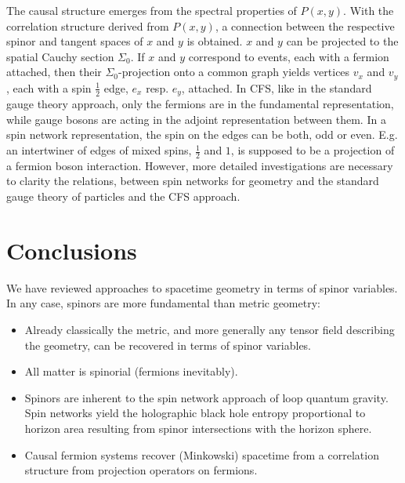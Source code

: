 \documentclass[11pt,a4paper]{article}
\theoremstyle{definition}
\begin{document}
	The causal structure emerges from the spectral properties of $P(x,y)$. With the correlation structure derived from $P(x,y)$, a connection between the respective spinor and tangent spaces
	of $x$ and $y$ is obtained. $x$ and $y$ can be projected to the spatial Cauchy section $\Sigma_0$.
	If $x$ and $y$ correspond to events, each with a fermion attached, then their $\Sigma_0$-projection onto a common graph yields vertices $v_x$ and  $v_y$, each with a spin $\frac{1}{2}$ edge,  $e_x$ resp. $e_y$, attached.   
	In CFS, like in the standard gauge theory approach, only the fermions are in the fundamental representation, while gauge bosons are acting in the adjoint representation between them.
	In a spin network representation, the spin on the edges can be both, odd or even. E.g. an intertwiner of edges of mixed spins, $\frac{1}{2}$ and $1$, is supposed to be a projection 
	of a fermion boson interaction. However, more detailed investigations are necessary to clarity the relations, between spin networks for geometry and the standard gauge theory of particles and the CFS approach.
	
	\section{Conclusions}
	
	We have reviewed approaches to spacetime geometry in terms of spinor variables.
	In any case, spinors are more fundamental than metric geometry:
	\begin{itemize}
		\item Already classically the metric, and more generally any tensor field describing the geometry, can be recovered in terms of spinor variables.
		\item All matter is spinorial (fermions inevitably).
		\item Spinors are inherent to the spin network approach of loop quantum gravity.
		Spin networks yield the holographic black hole entropy proportional to horizon area resulting from spinor intersections with the horizon sphere.
		\item Causal fermion systems recover (Minkowski) spacetime from a correlation structure from projection operators on fermions. 
	\end{itemize}
	
\end{document}
